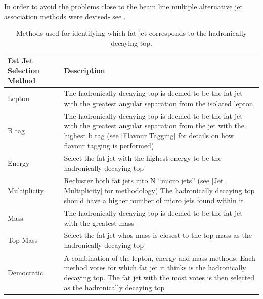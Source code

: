 In order to avoid the problems close to the beam line multiple alternative jet association methods were devised- see .
\begin{table}
  \centering
  \begin{tabular}{l |p{100mm}}
    \toprule
    Fat Jet Selection Method     & Description  \\
    \midrule
    Lepton & The hadronically decaying top is deemed to be the fat jet with the greatest angular separation from the isolated lepton\\
    \midrule
    B tag & The hadronically decaying top is deemed to be the fat jet with the greatest angular separation from the jet with the highest b tag (see \ref{Flavour Tagging} for details on how flavour tagging is performed)\\
    \midrule
    Energy & Select the fat jet with the highest energy to be the hadronically decaying top\\
    \midrule
    Multiplicity & Recluster both fat jets into N ``micro jets'' (see \ref{Jet Multiplicity} for methodology) The hadronically decaying top should have a higher number of micro jets found within it\\
    \midrule
    Mass & The hadronically decaying top is deemed to be the fat jet with the greatest mass \\
    \midrule
    Top Mass & Select the fat jet whos mass is closest to the top mass as the hadronically decaying top \\
    \midrule
    Democratic & A combination of the lepton, energy and mass methods. Each method votes for which fat jet it thinks is the hadronically decaying top. The fat jet with the most votes is then selected as the hadronically decaying top  \\
    \bottomrule
  \end{tabular}
  \caption{Methods used for identifying which fat jet corresponds to the hadronically decaying top.}
  \label{tab:methodDescription}
\end{table}

